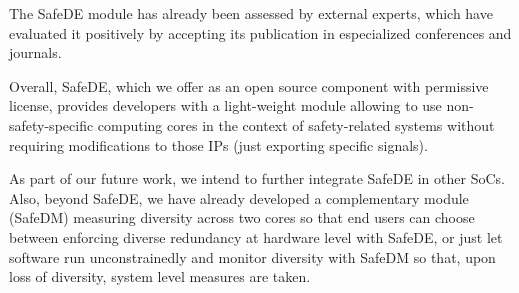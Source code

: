 \documentclass[a4paper,12pt]{article}
\begin{document}
The SafeDE module has already been assessed by external experts, which have evaluated it positively by accepting its publication in especialized conferences and journals.

Overall, SafeDE, which we offer as an open source component with permissive license, provides developers with a light-weight module allowing to use non-safety-specific computing cores in the context of safety-related systems without requiring modifications to those IPs (just exporting specific signals). 

As part of our future work, we intend to further integrate SafeDE in other SoCs. Also, beyond SafeDE, we have already developed a complementary module (SafeDM) measuring diversity across two cores so that end users can choose between enforcing diverse redundancy at hardware level with SafeDE, or just let software run unconstrainedly and monitor diversity with SafeDM so that, upon loss of diversity, system level measures are taken. 

\newpage

\medskip



%
%
%
\end{document}
